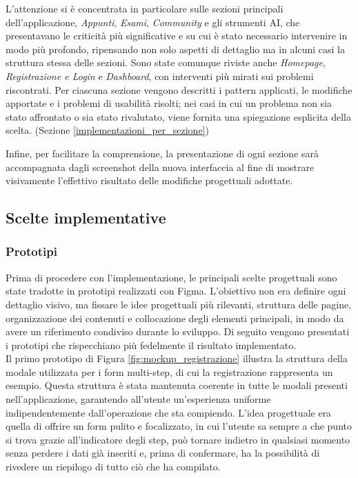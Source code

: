 L'attenzione si è concentrata in particolare sulle sezioni principali
dell'applicazione, \textit{Appunti}, \textit{Esami}, \textit{Community} e gli strumenti AI, che presentavano le criticità più significative e su cui è stato necessario intervenire in modo più profondo, ripensando non solo aspetti di dettaglio ma in alcuni casi la struttura stessa delle sezioni. Sono state comunque riviste anche \textit{Homepage}, \textit{Registrazione e Login} e \textit{Dashboard}, con interventi più mirati sui problemi riscontrati. Per ciascuna sezione vengono descritti i pattern applicati, le modifiche apportate e i problemi di usabilità
risolti; nei casi in cui un problema non sia stato affrontato o sia stato rivalutato, viene fornita una spiegazione esplicita della scelta. (Sezione \ref{implementazioni_per_sezione})

Infine, per facilitare la comprensione, la presentazione di ogni sezione sarà accompagnata dagli screenshot della nuova interfaccia al fine di mostrare visivamente l'effettivo risultato delle modifiche progettuali adottate.

\subsection{Scelte implementative}
\label{scelte_globali}
\subsubsection{Prototipi}
Prima di procedere con l'implementazione, le principali scelte progettuali sono
state tradotte in prototipi realizzati con Figma. L'obiettivo non era definire
ogni dettaglio visivo, ma fissare le idee progettuali più rilevanti, struttura
delle pagine, organizzazione dei contenuti e collocazione degli elementi
principali, in modo da avere un riferimento condiviso durante lo sviluppo.
Di seguito vengono presentati i prototipi che rispecchiano più fedelmente
il risultato implementato. \\

Il primo prototipo di Figura \ref{fig:mockup_registrazione} illustra la struttura della modale utilizzata per i form multi-step, di cui la registrazione rappresenta un esempio. Questa struttura è stata mantenuta coerente in tutte le modali presenti nell'applicazione, garantendo all'utente un'esperienza uniforme indipendentemente dall'operazione che sta compiendo. L'idea progettuale era quella di offrire un form pulito e focalizzato, in cui l'utente sa sempre a che punto si trova grazie all'indicatore degli step, può tornare indietro in qualsiasi momento senza perdere i dati già inseriti e, prima di confermare, ha la possibilità di rivedere un riepilogo di tutto ciò che ha compilato.

